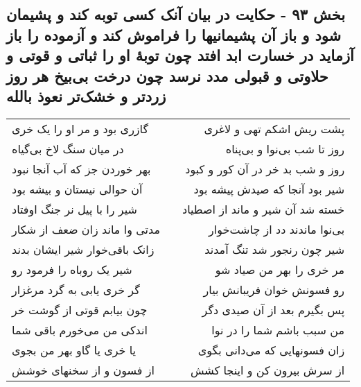 \begin{center}
\section*{بخش ۹۳ - حکایت در بیان آنک کسی توبه کند و پشیمان شود و باز آن پشیمانیها را فراموش کند و آزموده را باز آزماید در خسارت ابد افتد چون توبهٔ او را ثباتی و قوتی و حلاوتی و قبولی مدد نرسد چون درخت بی‌بیخ هر روز زردتر و خشک‌تر نعوذ بالله}
\label{sec:sh093}
\begin{longtable}{l p{0.5cm} r}
گازری بود و مر او را یک خری
&&
پشت ریش اشکم تهی و لاغری
\\
در میان سنگ لاخ بی‌گیاه
&&
روز تا شب بی‌نوا و بی‌پناه
\\
بهر خوردن جز که آب آنجا نبود
&&
روز و شب بد خر در آن کور و کبود
\\
آن حوالی نیستان و بیشه بود
&&
شیر بود آنجا که صیدش پیشه بود
\\
شیر را با پیل نر جنگ اوفتاد
&&
خسته شد آن شیر و ماند از اصطیاد
\\
مدتی وا ماند زان ضعف از شکار
&&
بی‌نوا ماندند دد از چاشت‌خوار
\\
زانک باقی‌خوار شیر ایشان بدند
&&
شیر چون رنجور شد تنگ آمدند
\\
شیر یک روباه را فرمود رو
&&
مر خری را بهر من صیاد شو
\\
گر خری یابی به گرد مرغزار
&&
رو فسونش خوان فریبانش بیار
\\
چون بیابم قوتی از گوشت خر
&&
پس بگیرم بعد از آن صیدی دگر
\\
اندکی من می‌خورم باقی شما
&&
من سبب باشم شما را در نوا
\\
یا خری یا گاو بهر من بجوی
&&
زان فسونهایی که می‌دانی بگوی
\\
از فسون و از سخنهای خوشش
&&
از سرش بیرون کن و اینجا کشش
\\
\end{longtable}
\end{center}
